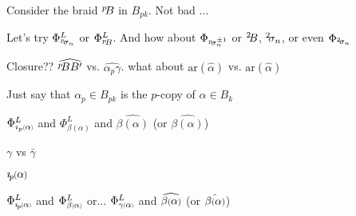 \documentclass{amsart}
\newcommand{\pp}[2][-2]{\ensuremath ^{#2}\hspace*{#1 pt}}
\newcommand*{\smallp}[1]{\scalebox{.75}{\ensuremath#1}}
\newcommand*{\subsmallp}[1]{\scalebox{.5}{\ensuremath#1}}
\begin{document}
 Consider the braid $\pp p B$ in $B_{pk}$. Not bad $\ldots$

Let's try $\Phi_{\pp [-1.5]p \sigma_n}^L$ or $\Phi_{\pp [-1.5]p B}^L$. And how about $\Phi_{\pp[-1.5]p \sigma_n^{\pm1}}$ or $\pp 2 B$, $\pp 2 \sigma_n$, or even $\Phi_{\pp[-1.5]2 \sigma_n}$

Closure?? $\widehat{\pp pB B'}$ vs. $\widehat{\alpha_p\gamma}$. what about $\text{ar}(\widehat{\alpha})$ vs. $\text{ar}(\hat{\alpha})$

Just say that $\alpha_p\in B_{pk}$ is the $p$-copy of $\alpha\in B_k$

$\Phi_{\imath_p\subsmallp(\alpha\subsmallp)}^L$ and $\Phi_{\beta(\alpha)}^L$ and $\widehat{\beta(\alpha)}$ (or $\hat{\beta(\alpha)}$)

$\gamma$ vs $\bar\gamma$

$\imath_{\hspace*{-1pt}p}\hspace*{-.5pt}\smallp(\alpha\smallp)$

$\Phi_{\imath_{\hspace*{-1pt}p}\hspace*{-.5pt}\subsmallp(\alpha\subsmallp)}^L$ and $\Phi_{\beta\subsmallp(\alpha\subsmallp)}^L$ or... $\Phi_{\gamma\subsmallp(\alpha\subsmallp)}^L$ and $\widehat{\beta\smallp(\alpha\smallp)}$ (or $\hat{\beta\smallp(\alpha\smallp)}$)
\end{document}
